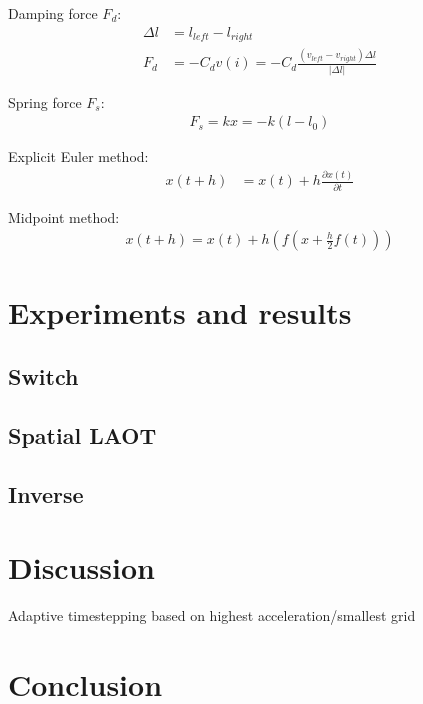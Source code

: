 \documentclass[11pt,a4paper]{article}
\providecommand{\abs}[1]{\left \lvert #1 \right \rvert}
\begin{document}
Damping force $F_d$:
\begin{align*}
    \Delta l &= l_{left} - l_{right} \\
    F_d      &= - C_d v(i) =  - C_d \frac{\left(v_{left} - v_{right}\right)
\Delta l}{\abs{\Delta l}}
\end{align*}

Spring force $F_s$:
\begin{align*}
    F_s = kx = -k \left( l - l_0 \right)
\end{align*}

Explicit Euler method:
\begin{align*}
    x(t+h) &= x(t) + h \frac{\partial x(t)}{\partial t}
\end{align*}

Midpoint method:
\begin{align*}
    x(t+h) = x(t) + h \left( f \left(x + \frac{h}{2} f \left(t \right) \right) \right)
\end{align*}

\section{Experiments and results}

\subsection{Switch}

\subsection{Spatial LAOT}

\subsection{Inverse}

\section{Discussion}

Adaptive timestepping based on highest acceleration/smallest grid

\section{Conclusion}


\cite{Keshav:2007}


\end{document}
